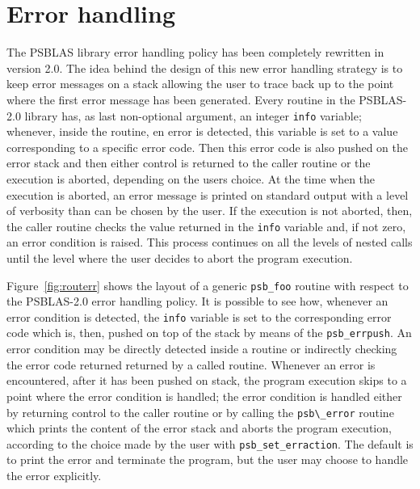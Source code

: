 

\section{Error handling}

The PSBLAS library error handling policy has been completely rewritten
in version 2.0. The idea behind the design of this new error handling
strategy is to keep error messages on a stack allowing the user to
trace back up to the point where the first error message has been
generated. Every routine in the PSBLAS-2.0 library has, as last
non-optional argument, an integer \verb|info| variable; whenever,
inside the routine, en error is detected, this variable is set to a
value corresponding to a specific error code. Then this error code is
also pushed on the error stack and then either control is returned to
the caller routine or the execution is aborted, depending on the users
choice. At the time when the execution is aborted, an error message is
printed on standard output with a level of verbosity than can be
chosen by the user. If the execution is not aborted, then, the caller
routine checks the value returned in the \verb|info| variable and, if
not zero, an error condition is raised. This process continues on all the
levels of nested calls until the level where the user decides to abort
the program execution.

Figure~\ref{fig:routerr} shows the layout of a generic \verb|psb_foo|
routine with respect to the PSBLAS-2.0 error handling policy. It is
possible to see how, whenever an error condition is detected, the
\verb|info| variable is set to the corresponding error code which is,
then, pushed on top of the stack by means of the
\verb|psb_errpush|. An error condition may be directly detected inside
a routine or indirectly checking the error code returned returned by a
called routine. Whenever an error is encountered, after it has been
pushed on stack, the program execution skips to a point where the
error condition is handled; the error condition is handled either by
returning control to the caller routine or by calling the
\verb|psb\_error| routine which prints the content of the error stack
and aborts the program execution, according to the choice made by the
user with \verb|psb_set_erraction|. The default is to print the error
and terminate the program, but the user may choose to handle the error
explicitly. 

